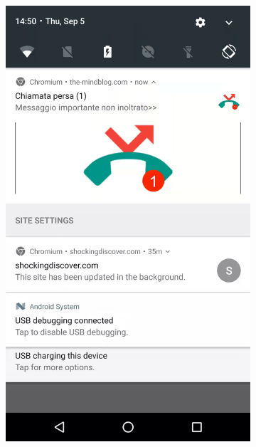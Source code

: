 \begin{figure}[h]
\begin{center}
    \begin{subfigure}{.18\textwidth}
    \begin{center}
        \includegraphics[scale=0.06]{figs/mobile_1}
        \caption{}
    \end{center}
    \end{subfigure}
   \begin{subfigure}{.18\textwidth} 

\end{subfigure}
\end{center}
\end{figure}
